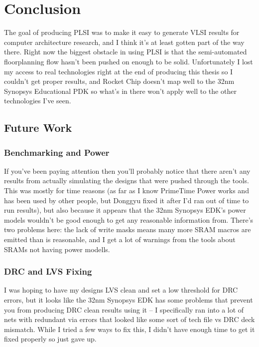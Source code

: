 \documentclass{article}
\begin{document}
\chapter{Conclusion}

The goal of producing PLSI was to make it easy to generate VLSI results for
computer architecture research, and I think it's at least gotten part of the
way there.  Right now the biggest obstacle in using PLSI is that the
semi-automated floorplanning flow hasn't been pushed on enough to be solid.
Unfortunately I lost my access to real technologies right at the end of
producing this thesis so I couldn't get proper results, and Rocket Chip doesn't
map well to the 32nm Synopsys Educational PDK so what's in there won't apply
well to the other technologies I've seen.

\section{Future Work}

\subsection{Benchmarking and Power}

If you've been paying attention then you'll probably notice that there aren't
any results from actually simulating the designs that were pushed through the
tools.  This was mostly for time reasons (as far as I know PrimeTime Power
works and has been used by other people, but Donggyu fixed it after I'd ran out
of time to run results), but also because it appears that the 32nm Synopsys
EDK's power models wouldn't be good enough to get any reasonable information
from.  There's two problems here: the lack of write masks means many more SRAM
macros are emitted than is reasonable, and I get a lot of warnings from the
tools about SRAMs not having power modells.

\subsection{DRC and LVS Fixing}

I was hoping to have my designs LVS clean and set a low threshold for DRC
errors, but it looks like the 32nm Synopsys EDK has some problems that prevent
you from producing DRC clean results using it -- I specifically ran into a lot
of nets with redundant via errors that looked like some sort of tech file vs
DRC deck mismatch.  While I tried a few ways to fix this, I didn't have enough
time to get it fixed properly so just gave up.
\end{document}
